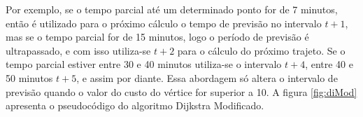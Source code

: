 Por exemplo, se o tempo parcial até um determinado ponto for de 7 minutos, então
é utilizado para o próximo cálculo o tempo de previsão no intervalo $t + 1$, mas se o tempo parcial for de 15 minutos, logo
o período de previsão é ultrapassado, e com isso utiliza-se $t + 2$ para o cálculo do próximo trajeto. Se o tempo parcial
estiver entre 30 e 40 minutos utiliza-se o intervalo $t + 4$, entre 40 e 50 minutos $t + 5$, e assim por diante.
Essa abordagem só altera o intervalo de previsão quando o valor do custo do vértice for superior a 10.
A figura \ref{fig:diMod} apresenta o pseudocódigo do algoritmo Dijkstra Modificado.

